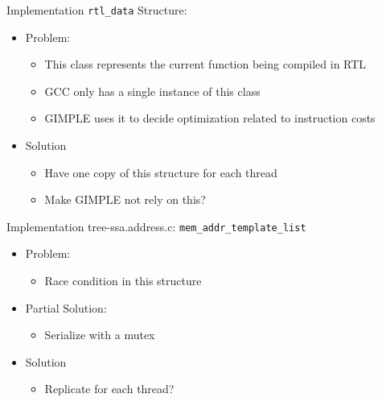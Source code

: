 \begin{frame}{Implementation}
    \texttt{rtl\_data} Structure: 
    \begin{itemize}
        \item Problem: 
            \begin{itemize}
                \item This class represents the current function being compiled in RTL
                \item GCC only has a single instance of this class
                \item GIMPLE uses it to decide optimization related to instruction costs
            \end{itemize}
        \item Solution 
            \begin{itemize}
                \item Have one copy of this structure for each thread
                \item Make GIMPLE not rely on this? 
            \end{itemize}
    \end{itemize}
\end{frame}

\begin{frame}{Implementation}
    tree-ssa.address.c: \texttt{mem\_addr\_template\_list} 

    \begin{itemize}
        \item Problem:
            \begin{itemize}
                \item Race condition in this structure
            \end{itemize}
        \item Partial Solution:
            \begin{itemize}
                \item Serialize with a mutex
            \end{itemize}
        \item Solution 
            \begin{itemize}
                \item Replicate for each thread?
            \end{itemize}
    \end{itemize}

\end{frame}

